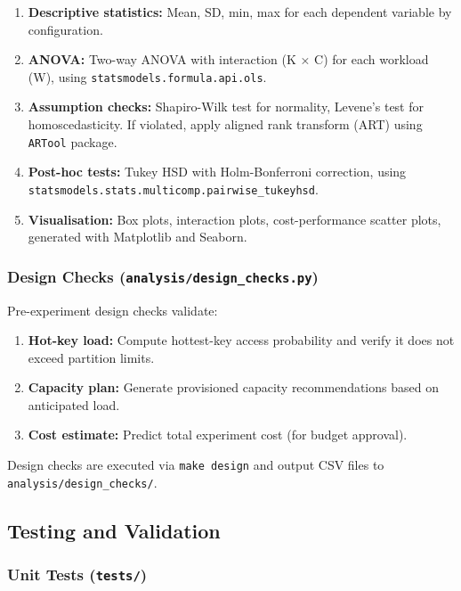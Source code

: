 \begin{enumerate}
    \item \textbf{Descriptive statistics:} Mean, SD, min, max for each dependent variable by configuration.
    \item \textbf{ANOVA:} Two-way ANOVA with interaction (K × C) for each workload (W), using \texttt{statsmodels.formula.api.ols}.
    \item \textbf{Assumption checks:} Shapiro-Wilk test for normality, Levene's test for homoscedasticity. If violated, apply aligned rank transform (ART) using \texttt{ARTool} package.
    \item \textbf{Post-hoc tests:} Tukey HSD with Holm-Bonferroni correction, using \texttt{statsmodels.stats.multicomp.pairwise\_tukeyhsd}.
    \item \textbf{Visualisation:} Box plots, interaction plots, cost-performance scatter plots, generated with Matplotlib and Seaborn.
\end{enumerate}

\subsubsection{Design Checks (\texttt{analysis/design\_checks.py})}

Pre-experiment design checks validate:

\begin{enumerate}
    \item \textbf{Hot-key load:} Compute hottest-key access probability and verify it does not exceed partition limits.
    \item \textbf{Capacity plan:} Generate provisioned capacity recommendations based on anticipated load.
    \item \textbf{Cost estimate:} Predict total experiment cost (for budget approval).
\end{enumerate}

Design checks are executed via \texttt{make design} and output CSV files to \texttt{analysis/design\_checks/}.

\subsection{Testing and Validation}

\subsubsection{Unit Tests (\texttt{tests/})}

